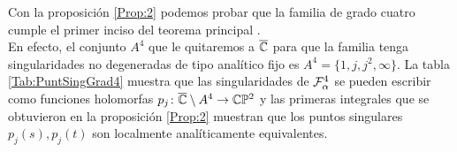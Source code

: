 Con la proposición \ref{Prop:2} podemos probar que la familia de grado cuatro cumple el primer inciso del teorema principal %
.\\

En efecto, el conjunto $A^{4}$ que le quitaremos a $\overline\C$ para que la familia tenga singularidades no degeneradas de tipo analítico fijo es $A^{4} = \{1,j,j^{2},\infty\}$. La tabla \ref{Tab:PuntSingGrad4} muestra que las singularidades de $\Fol[4]{\alpha}$ se pueden escribir como funciones holomorfas $p_{j}\colon \overline\C\setminus A^{4}\rightarrow\CP$ y las primeras integrales que se obtuvieron en la proposición \ref{Prop:2} muestran que los puntos singulares $p_{j}(s),p_{j}(t)$ son localmente analíticamente equivalentes. 
